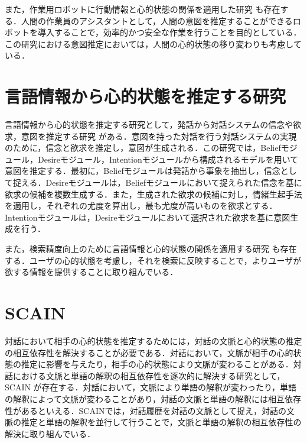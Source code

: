 \par
また，作業用ロボットに行動情報と心的状態の関係を適用した研究 \cite{inbook}も存在する．人間の作業員のアシスタントとして，人間の意図を推定することができるロボットを導入することで，効率的かつ安全な作業を行うことを目的としている．この研究における意図推定においては，人間の心的状態の移り変わりも考慮している．

\section{言語情報から心的状態を推定する研究}
\par
言語情報から心的状態を推定する研究として，発話から対話システムの信念や欲求，意図を推定する研究 \cite{高橋拓誠2015bdi}がある．意図を持った対話を行う対話システムの実現のために，信念と欲求を推定し，意図が生成される．この研究では，Beliefモジュール，Desireモジュール，Intentionモジュールから構成されるモデルを用いて意図を推定する．最初に，Beliefモジュールは発話から事象を抽出し，信念として捉える．Desireモジュールは，Beliefモジュールにおいて捉えられた信念を基に欲求の候補を複数生成する．また，生成された欲求の候補に対し，情緒生起手法 \cite{2002}を適用し，それぞれの尤度を算出し，最も尤度が高いものを欲求とする．Intentionモジュールは，Desireモジュールにおいて選択された欲求を基に意図生成を行う．

\par
また，検索精度向上のために言語情報と心的状態の関係を適用する研究 \cite{10.1007/978-3-642-02481-8_4}も存在する．ユーザの心的状態を考慮し，それを検索に反映することで，よりユーザが欲する情報を提供することに取り組んでいる．

\section{SCAIN}
対話において相手の心的状態を推定するためには，対話の文脈と心的状態の推定の相互依存性を解決することが必要である．対話において，文脈が相手の心的状態の推定に影響を与えたり，相手の心的状態により文脈が変わることがある．対話における文脈と単語の解釈の相互依存性を逐次的に解決する研究として，SCAIN \cite{takimoto2020slaminspired}が存在する．対話において，文脈により単語の解釈が変わったり，単語の解釈によって文脈が変わることがあり，対話の文脈と単語の解釈には相互依存性があるといえる．SCAINでは，対話履歴を対話の文脈として捉え，対話の文脈の推定と単語の解釈を並行して行うことで，文脈と単語の解釈の相互依存性の解決に取り組んでいる．

